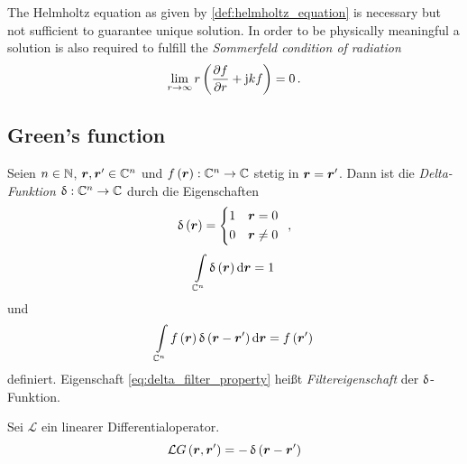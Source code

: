 \begin{remark}\label{rem:sommerfeld_radiation_condition}
	The Helmholtz equation as given by \cref{def:helmholtz_equation} is necessary but not sufficient to guarantee unique solution. In order to be physically meaningful a solution is also required to fulfill the \emph{Sommerfeld condition of radiation} \cite[S.~189]{Sommerfeld1964}
	\begin{equation}
		\lim\limits_{r\rightarrow\infty} r \left(\pd[f]{r} + \im k f \right) = 0 \, .
	\end{equation}
\end{remark}

\subsection{Green's function}

\begin{definition}
	Seien $n\in\N$, $\robs,\rsrc\in\C^n$ und $f\left(\robs\right):\C^n\rightarrow\C$ stetig in $\robs = \rsrc$. Dann ist die \emph{Delta-Funktion} $\diracDelta:\C^n \rightarrow \C$ durch die Eigenschaften
	\begin{equation}
		\diracDelta\left(\robs\right) = \begin{cases*}
			1 & $\robs = 0$ \\
			0 & $\robs \neq 0$
		\end{cases*} \, ,
	\end{equation}
	\begin{equation}
		\int\limits_{\C^n} \diracDelta\left(\robs\right) \dd \robs = 1
	\end{equation}
	und
	\begin{equation}\label{eq:delta_filter_property}
		\int\limits_{\C^n} f\left(\robs\right) \diracDelta\left(\robs-\rsrc\right) \dd \robs = f\left(\rsrc\right)
	\end{equation}
	definiert. Eigenschaft \eqref{eq:delta_filter_property} heißt \emph{Filtereigenschaft} der $\diracDelta$-Funktion.
\end{definition}

\begin{definition}
	Sei $\mathcal{L}$ ein linearer Differentialoperator.
	\begin{equation}
		\mathcal{L} G\left(\robs, \rsrc \right) = -\diracDelta\left(\robs - \rsrc\right)
	\end{equation}
\end{definition}


